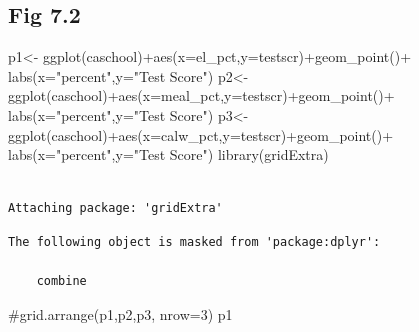 \documentclass[
  letterpaper,
  DIV=11,
  numbers=noendperiod]{scrartcl}
\newenvironment{Shaded}{\begin{snugshade}}{\end{snugshade}}
\newcommand{\AttributeTok}[1]{\textcolor[rgb]{0.56,0.74,0.73}{#1}}
\newcommand{\CommentTok}[1]{\textcolor[rgb]{0.38,0.43,0.53}{#1}}
\newcommand{\FunctionTok}[1]{\textcolor[rgb]{0.53,0.75,0.82}{#1}}
\newcommand{\NormalTok}[1]{\textcolor[rgb]{0.85,0.87,0.91}{#1}}
\newcommand{\OtherTok}[1]{\textcolor[rgb]{0.56,0.74,0.73}{#1}}
\newcommand{\SpecialCharTok}[1]{\textcolor[rgb]{0.92,0.80,0.55}{#1}}
\newcommand{\StringTok}[1]{\textcolor[rgb]{0.64,0.75,0.55}{#1}}
\begin{document}
\hypertarget{fig-7.2}{%
\subsection{Fig 7.2}\label{fig-7.2}}

\begin{Shaded}
\begin{Highlighting}[]
\NormalTok{p1}\OtherTok{\textless{}{-}} \FunctionTok{ggplot}\NormalTok{(caschool)}\SpecialCharTok{+}\FunctionTok{aes}\NormalTok{(}\AttributeTok{x=}\NormalTok{el\_pct,}\AttributeTok{y=}\NormalTok{testscr)}\SpecialCharTok{+}\FunctionTok{geom\_point}\NormalTok{()}\SpecialCharTok{+}
  \FunctionTok{labs}\NormalTok{(}\AttributeTok{x=}\StringTok{"percent"}\NormalTok{,}\AttributeTok{y=}\StringTok{"Test Score"}\NormalTok{)}
\NormalTok{p2}\OtherTok{\textless{}{-}} \FunctionTok{ggplot}\NormalTok{(caschool)}\SpecialCharTok{+}\FunctionTok{aes}\NormalTok{(}\AttributeTok{x=}\NormalTok{meal\_pct,}\AttributeTok{y=}\NormalTok{testscr)}\SpecialCharTok{+}\FunctionTok{geom\_point}\NormalTok{()}\SpecialCharTok{+}
  \FunctionTok{labs}\NormalTok{(}\AttributeTok{x=}\StringTok{"percent"}\NormalTok{,}\AttributeTok{y=}\StringTok{"Test Score"}\NormalTok{)}
\NormalTok{p3}\OtherTok{\textless{}{-}} \FunctionTok{ggplot}\NormalTok{(caschool)}\SpecialCharTok{+}\FunctionTok{aes}\NormalTok{(}\AttributeTok{x=}\NormalTok{calw\_pct,}\AttributeTok{y=}\NormalTok{testscr)}\SpecialCharTok{+}\FunctionTok{geom\_point}\NormalTok{()}\SpecialCharTok{+}
  \FunctionTok{labs}\NormalTok{(}\AttributeTok{x=}\StringTok{"percent"}\NormalTok{,}\AttributeTok{y=}\StringTok{"Test Score"}\NormalTok{)}
\FunctionTok{library}\NormalTok{(gridExtra)}
\end{Highlighting}
\end{Shaded}

\begin{verbatim}

Attaching package: 'gridExtra'
\end{verbatim}

\begin{verbatim}
The following object is masked from 'package:dplyr':

    combine
\end{verbatim}

\begin{Shaded}
\begin{Highlighting}[]
\CommentTok{\#grid.arrange(p1,p2,p3, nrow=3)}
\NormalTok{p1}
\end{Highlighting}
\end{Shaded}
\end{document}
